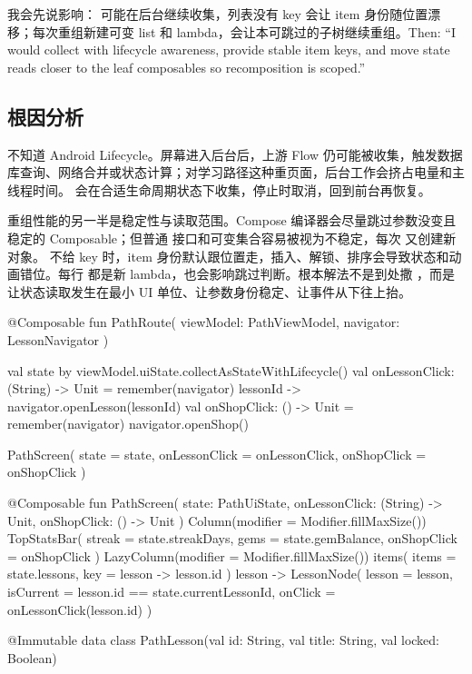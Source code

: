 \begin{sayit}[面试里怎么说]
我会先说影响： 可能在后台继续收集，列表没有 key 会让 item 身份随位置漂移；每次重组新建可变 list 和 lambda，会让本可跳过的子树继续重组。Then: ``I would collect with lifecycle awareness, provide stable item keys, and move state reads closer to the leaf composables so recomposition is scoped.''
\end{sayit}

\subsection*{根因分析}
 不知道 Android Lifecycle。屏幕进入后台后，上游 Flow 仍可能被收集，触发数据库查询、网络合并或状态计算；对学习路径这种重页面，后台工作会挤占电量和主线程时间。 会在合适生命周期状态下收集，停止时取消，回到前台再恢复。

重组性能的另一半是稳定性与读取范围。Compose 编译器会尽量跳过参数没变且稳定的 Composable；但普通  接口和可变集合容易被视为不稳定，每次  又创建新对象。 不给 key 时，item 身份默认跟位置走，插入、解锁、排序会导致状态和动画错位。每行  都是新 lambda，也会影响跳过判断。根本解法不是到处撒 ，而是让状态读取发生在最小 UI 单位、让参数身份稳定、让事件从下往上抬。

\begin{ktfix}
@Composable
fun PathRoute(
    viewModel: PathViewModel,
    navigator: LessonNavigator
) {
    val state by viewModel.uiState.collectAsStateWithLifecycle()
    val onLessonClick: (String) -> Unit = remember(navigator) {
        { lessonId -> navigator.openLesson(lessonId) }
    }
    val onShopClick: () -> Unit = remember(navigator) {
        { navigator.openShop() }
    }

    PathScreen(
        state = state,
        onLessonClick = onLessonClick,
        onShopClick = onShopClick
    )
}

@Composable
fun PathScreen(
    state: PathUiState,
    onLessonClick: (String) -> Unit,
    onShopClick: () -> Unit
) {
    Column(modifier = Modifier.fillMaxSize()) {
        TopStatsBar(
            streak = state.streakDays,
            gems = state.gemBalance,
            onShopClick = onShopClick
        )
        LazyColumn(modifier = Modifier.fillMaxSize()) {
            items(
                items = state.lessons,
                key = { lesson -> lesson.id }
            ) { lesson ->
                LessonNode(
                    lesson = lesson,
                    isCurrent = lesson.id == state.currentLessonId,
                    onClick = { onLessonClick(lesson.id) }
                )
            }
        }
    }
}

@Immutable
data class PathLesson(val id: String, val title: String, val locked: Boolean)
\end{ktfix}

